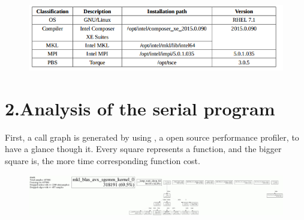 \documentclass{article}
\begin{document}
\begin{figure}[tbp]%
\begin{mdcenter}%

\noindent{}\includegraphics[keepaspectratio=true,width=\dimmin{}{\dimwidth{0.90}}]{images/2016-02-18-23-13-11-}{}%

\mdhr{}%

\noindent{}%
\end{mdcenter}\label{fig-myfigure}%
\end{figure}%

\section{2.\hspace*{0.5em}Analysis of the serial program}\label{sec-analysis-of-the-serial-program}%

\noindent{}First, a call graph is generated by using ,
 a open source performance profiler, to have a glance though it. Every square represents a function, and the bigger square is, the more time corresponding function cost.%

\begin{figure}[tbp]%
\begin{mdcenter}%

\noindent{}\includegraphics[keepaspectratio=true,width=\dimmin{}{\dimwidth{0.90}}]{images/100001994364201}{}%

\mdhr{}%

\noindent{}%
\end{mdcenter}\label{fig-myfigure}%
\end{figure}%
\end{document}
